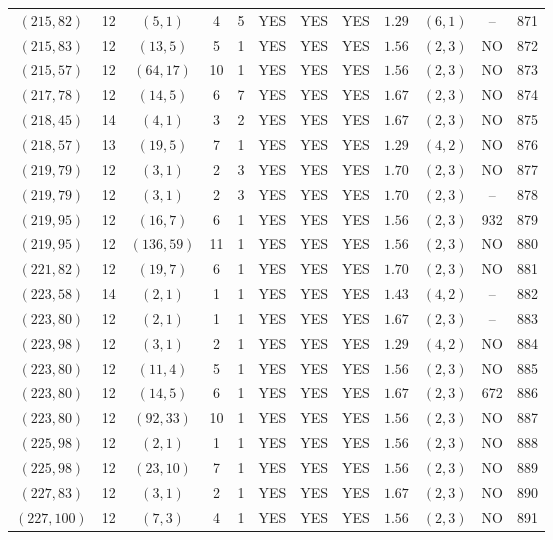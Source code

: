 \begin{longtable}{|c|c|c|c|c|c|c|c|c|c|c|c|}
$(215,82)$ & 12 & $(5,1)$ & 4 & 5 & YES & YES & YES & $1.29$ & $(6,1)$ & -- & 871\\
$(215,83)$ & 12 & $(13,5)$ & 5 & 1 & YES & YES & YES & $1.56$ & $(2,3)$ & NO & 872\\
$(215,57)$ & 12 & $(64,17)$ & 10 & 1 & YES & YES & YES & $1.56$ & $(2,3)$ & NO & 873\\
$(217,78)$ & 12 & $(14,5)$ & 6 & 7 & YES & YES & YES & $1.67$ & $(2,3)$ & NO & 874\\
$(218,45)$ & 14 & $(4,1)$ & 3 & 2 & YES & YES & YES & $1.67$ & $(2,3)$ & NO & 875\\
$(218,57)$ & 13 & $(19,5)$ & 7 & 1 & YES & YES & YES & $1.29$ & $(4,2)$ & NO & 876\\
$(219,79)$ & 12 & $(3,1)$ & 2 & 3 & YES & YES & YES & $1.70$ & $(2,3)$ & NO & 877\\
$(219,79)$ & 12 & $(3,1)$ & 2 & 3 & YES & YES & YES & $1.70$ & $(2,3)$ & -- & 878\\
$(219,95)$ & 12 & $(16,7)$ & 6 & 1 & YES & YES & YES & $1.56$ & $(2,3)$ & 932 & 879\\
$(219,95)$ & 12 & $(136,59)$ & 11 & 1 & YES & YES & YES & $1.56$ & $(2,3)$ & NO & 880\\
$(221,82)$ & 12 & $(19,7)$ & 6 & 1 & YES & YES & YES & $1.70$ & $(2,3)$ & NO & 881\\
$(223,58)$ & 14 & $(2,1)$ & 1 & 1 & YES & YES & YES & $1.43$ & $(4,2)$ & -- & 882\\
$(223,80)$ & 12 & $(2,1)$ & 1 & 1 & YES & YES & YES & $1.67$ & $(2,3)$ & -- & 883\\
$(223,98)$ & 12 & $(3,1)$ & 2 & 1 & YES & YES & YES & $1.29$ & $(4,2)$ & NO & 884\\
$(223,80)$ & 12 & $(11,4)$ & 5 & 1 & YES & YES & YES & $1.56$ & $(2,3)$ & NO & 885\\
$(223,80)$ & 12 & $(14,5)$ & 6 & 1 & YES & YES & YES & $1.67$ & $(2,3)$ & 672 & 886\\
$(223,80)$ & 12 & $(92,33)$ & 10 & 1 & YES & YES & YES & $1.56$ & $(2,3)$ & NO & 887\\
$(225,98)$ & 12 & $(2,1)$ & 1 & 1 & YES & YES & YES & $1.56$ & $(2,3)$ & NO & 888\\
$(225,98)$ & 12 & $(23,10)$ & 7 & 1 & YES & YES & YES & $1.56$ & $(2,3)$ & NO & 889\\
$(227,83)$ & 12 & $(3,1)$ & 2 & 1 & YES & YES & YES & $1.67$ & $(2,3)$ & NO & 890\\
$(227,100)$ & 12 & $(7,3)$ & 4 & 1 & YES & YES & YES & $1.56$ & $(2,3)$ & NO & 891\\

\end{longtable}
